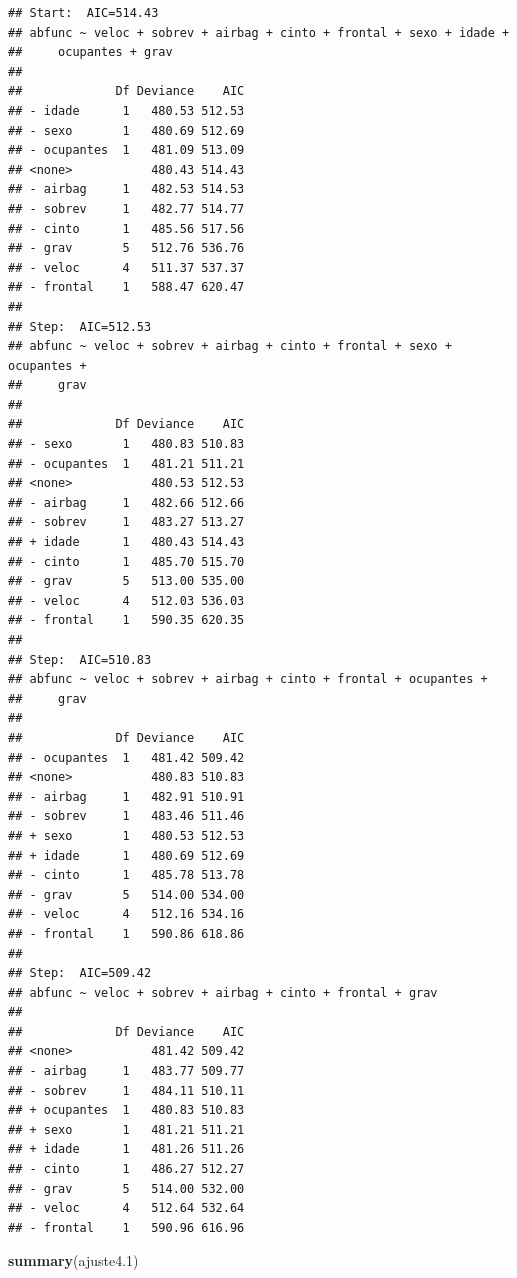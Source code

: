 \documentclass[]{article}
\newenvironment{Shaded}{\begin{snugshade}}{\end{snugshade}}
\newcommand{\KeywordTok}[1]{\textcolor[rgb]{0.13,0.29,0.53}{\textbf{{#1}}}}
\newcommand{\FloatTok}[1]{\textcolor[rgb]{0.00,0.00,0.81}{{#1}}}
\newcommand{\NormalTok}[1]{{#1}}
\begin{document}
\begin{verbatim}
## Start:  AIC=514.43
## abfunc ~ veloc + sobrev + airbag + cinto + frontal + sexo + idade + 
##     ocupantes + grav
## 
##             Df Deviance    AIC
## - idade      1   480.53 512.53
## - sexo       1   480.69 512.69
## - ocupantes  1   481.09 513.09
## <none>           480.43 514.43
## - airbag     1   482.53 514.53
## - sobrev     1   482.77 514.77
## - cinto      1   485.56 517.56
## - grav       5   512.76 536.76
## - veloc      4   511.37 537.37
## - frontal    1   588.47 620.47
## 
## Step:  AIC=512.53
## abfunc ~ veloc + sobrev + airbag + cinto + frontal + sexo + ocupantes + 
##     grav
## 
##             Df Deviance    AIC
## - sexo       1   480.83 510.83
## - ocupantes  1   481.21 511.21
## <none>           480.53 512.53
## - airbag     1   482.66 512.66
## - sobrev     1   483.27 513.27
## + idade      1   480.43 514.43
## - cinto      1   485.70 515.70
## - grav       5   513.00 535.00
## - veloc      4   512.03 536.03
## - frontal    1   590.35 620.35
## 
## Step:  AIC=510.83
## abfunc ~ veloc + sobrev + airbag + cinto + frontal + ocupantes + 
##     grav
## 
##             Df Deviance    AIC
## - ocupantes  1   481.42 509.42
## <none>           480.83 510.83
## - airbag     1   482.91 510.91
## - sobrev     1   483.46 511.46
## + sexo       1   480.53 512.53
## + idade      1   480.69 512.69
## - cinto      1   485.78 513.78
## - grav       5   514.00 534.00
## - veloc      4   512.16 534.16
## - frontal    1   590.86 618.86
## 
## Step:  AIC=509.42
## abfunc ~ veloc + sobrev + airbag + cinto + frontal + grav
## 
##             Df Deviance    AIC
## <none>           481.42 509.42
## - airbag     1   483.77 509.77
## - sobrev     1   484.11 510.11
## + ocupantes  1   480.83 510.83
## + sexo       1   481.21 511.21
## + idade      1   481.26 511.26
## - cinto      1   486.27 512.27
## - grav       5   514.00 532.00
## - veloc      4   512.64 532.64
## - frontal    1   590.96 616.96
\end{verbatim}

\begin{Shaded}
\begin{Highlighting}[]
\KeywordTok{summary}\NormalTok{(ajuste4}\FloatTok{.1}\NormalTok{)}
\end{Highlighting}
\end{Shaded}
\end{document}
